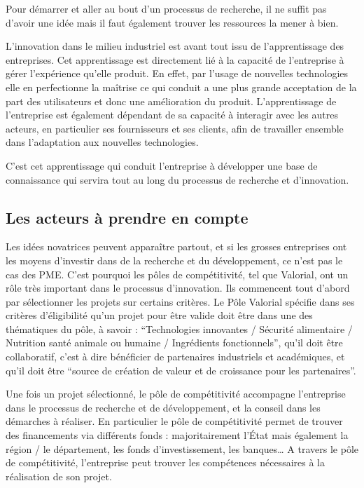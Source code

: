 \documentclass[a4paper,10pt]{report}
\begin{document}
			Pour démarrer et aller au bout d’un processus de recherche, il ne suffit pas d’avoir une idée mais il faut également trouver les ressources la mener à bien.
			
			L’innovation dans le milieu industriel est avant tout issu de l’apprentissage des entreprises. Cet apprentissage est directement lié à la capacité de l’entreprise à gérer l’expérience qu’elle produit. En effet, par l’usage de nouvelles technologies elle en perfectionne la maîtrise ce qui conduit a une plus grande acceptation de la part des utilisateurs et donc une amélioration du produit. 
			L’apprentissage de l’entreprise est également dépendant de sa capacité à interagir avec les autres acteurs, en particulier ses fournisseurs et ses clients, afin de travailler ensemble dans l’adaptation aux nouvelles technologies.
			
			C’est cet apprentissage qui conduit l’entreprise à développer une base de connaissance qui servira tout au long du processus de recherche et d’innovation.
			
		\subsection{Les acteurs à prendre en compte}
			Les idées novatrices peuvent apparaître partout, et si les grosses entreprises ont les moyens d’investir dans de la recherche et du développement, ce n’est pas le cas des PME. C’est pourquoi les pôles de compétitivité, tel que Valorial, ont un rôle très important dans le processus d’innovation. Ils commencent tout d’abord par sélectionner les projets sur certains critères. Le Pôle Valorial spécifie dans ses critères d’éligibilité qu’un projet pour être valide doit être dans une des thématiques du pôle, à savoir : “Technologies innovantes / Sécurité alimentaire / Nutrition santé animale ou humaine / Ingrédients fonctionnels”, qu’il doit être collaboratif, c’est à dire bénéficier de partenaires industriels et académiques, et qu’il doit être “source de création de valeur et de croissance pour les partenaires”.
			
			Une fois un projet sélectionné, le pôle de compétitivité accompagne l’entreprise dans le processus de recherche et de développement, et la conseil dans les démarches à réaliser. En particulier le pôle de compétitivité permet de trouver des financements via différents fonds : majoritairement l’État mais également la région / le département, les fonds d’investissement, les banques…
			A travers le pôle de compétitivité, l’entreprise peut trouver les compétences nécessaires à la réalisation de son projet.
				
\end{document}

